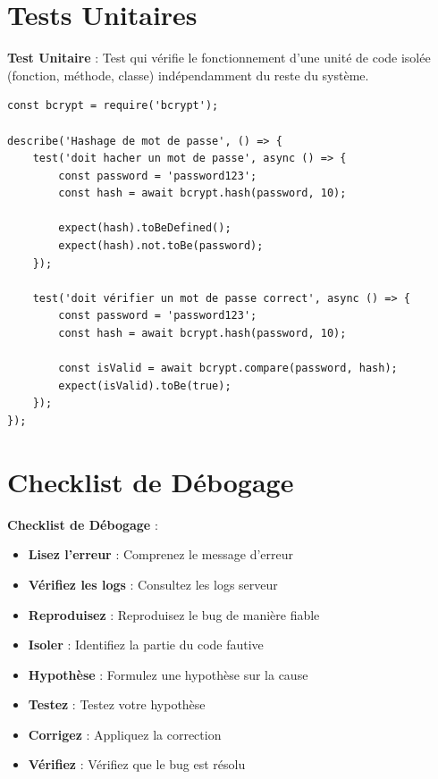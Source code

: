 \section{Tests Unitaires}

\begin{definitionbox}
    \textbf{Test Unitaire} : Test qui vérifie le fonctionnement d'une unité de code isolée (fonction, méthode, classe) indépendamment du reste du système.
\end{definitionbox}

\begin{lstlisting}[style=javascript, caption=Exemple de test unitaire avec Jest]
const bcrypt = require('bcrypt');

describe('Hashage de mot de passe', () => {
    test('doit hacher un mot de passe', async () => {
        const password = 'password123';
        const hash = await bcrypt.hash(password, 10);
        
        expect(hash).toBeDefined();
        expect(hash).not.toBe(password);
    });
    
    test('doit vérifier un mot de passe correct', async () => {
        const password = 'password123';
        const hash = await bcrypt.hash(password, 10);
        
        const isValid = await bcrypt.compare(password, hash);
        expect(isValid).toBe(true);
    });
});
\end{lstlisting}

\section{Checklist de Débogage}

\begin{bestpracticebox}
    \textbf{Checklist de Débogage} :
    \begin{itemize}
        \item \textbf{Lisez l'erreur} : Comprenez le message d'erreur
        \item \textbf{Vérifiez les logs} : Consultez les logs serveur
        \item \textbf{Reproduisez} : Reproduisez le bug de manière fiable
        \item \textbf{Isoler} : Identifiez la partie du code fautive
        \item \textbf{Hypothèse} : Formulez une hypothèse sur la cause
        \item \textbf{Testez} : Testez votre hypothèse
        \item \textbf{Corrigez} : Appliquez la correction
        \item \textbf{Vérifiez} : Vérifiez que le bug est résolu
    \end{itemize}
\end{bestpracticebox}

